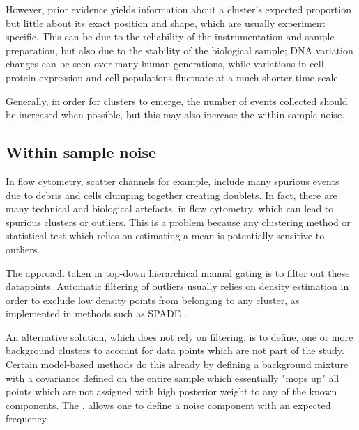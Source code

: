However, prior evidence yields information about a cluster's expected proportion but little about its exact position and shape, which are usually experiment specific.
This can be due to the reliability of the instrumentation and sample preparation, but also due to the stability of the biological sample; DNA variation changes can be seen over many human generations, while variations in cell protein expression and cell populations fluctuate at a much shorter time scale.

Generally, in order for clusters to emerge, the number of events collected should be increased when possible, but this may also increase the within sample noise.


\subsection{ Within sample noise }

In flow cytometry, scatter channels for example, include many spurious events due to debris and cells clumping together creating doublets.
In fact, there are many technical and biological artefacts, in flow cytometry, which can lead to spurious clusters or outliers.
This is a problem because any clustering method or statistical test which relies on estimating a mean is potentially sensitive to outliers.

The approach taken in top-down hierarchical manual gating is to filter out these datapoints.
Automatic filtering of outliers usually relies on density estimation in order to exclude low density points from belonging to any cluster, as implemented in methods such as SPADE \citep{Simonds:2011jh}.

An alternative solution, which does not rely on filtering, is to define, one or more background clusters to account for data points which are not part of the study.
Certain model-based methods do this already by defining a background mixture with a covariance defined on the entire sample which essentially "mops up" all points which are not assigned with high posterior weight to any of the known components.
The , allows one to define a noise component with an expected frequency.

